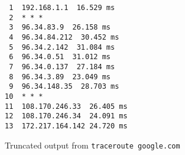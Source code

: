 \begin{code}
\centering
\begin{minipage}{0.33\textwidth}
    \begin{verbatim}
 1  192.168.1.1  16.529 ms
 2  * * *
 3  96.34.83.9  26.158 ms
 4  96.34.84.212  30.452 ms
 5  96.34.2.142  31.084 ms
 6  96.34.0.51  31.012 ms
 7  96.34.0.137  27.184 ms
 8  96.34.3.89  23.049 ms
 9  96.34.148.35  28.703 ms
10  * * *
11  108.170.246.33  26.405 ms
12  108.170.246.34  24.091 ms
13  172.217.164.142 24.720 ms
    \end{verbatim}
\end{minipage}
    \caption{Truncated output from \texttt{traceroute google.com}}
    \label{fig:sample_traceroute}
\end{code}
